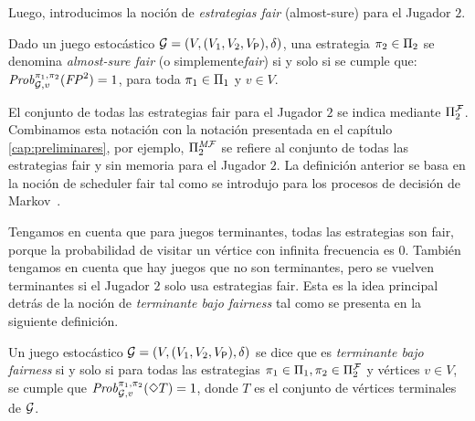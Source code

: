 
Luego, introducimos la noción de \emph{estrategias fair} (almost-sure) para el Jugador $2$.
\begin{definition} Dado un juego estocástico $\mathcal{G} = (V, (V_1, V_2, V_{\mathsf{P}}), \delta)$,
una estrategia $\pi_{2} \in \Pi_{2}$ se denomina \emph{almost-sure fair} (o simplemente\emph{fair}) si y solo si se cumple que:
$\mathit{Prob}^{\pi_{1}, \pi_{2}}_{\mathcal{G},v}(\mathit{FP}^2) = 1$,
para toda $\pi_{1} \in \Pi_{1}$ y $v \in V$. 
\end{definition}
%
El conjunto de todas las estrategias fair para el Jugador $2$ se indica mediante $\Pi^{\mathcal{F}}_{2}$. Combinamos esta notación con la notación presentada en el capítulo \ref{cap:preliminares}, por ejemplo, $\Pi^{\textit{M}\mathcal{F}}_{2}$ se refiere al conjunto de todas las estrategias fair y sin memoria para el Jugador $2$.
%
La definición anterior se basa en la noción de scheduler fair tal como se introdujo para los procesos de decisión de Markov~\cite{DBLP:journals/dc/BaierK98,BaierK08}.

Tengamos en cuenta que para juegos terminantes, todas las estrategias son fair, porque la probabilidad de visitar un vértice con infinita frecuencia es $0$.
%
También tengamos en cuenta que hay juegos que no son terminantes, pero se vuelven terminantes si el Jugador $2$ solo usa estrategias fair. Esta es la idea principal detrás de la noción de \emph{terminante bajo fairness} tal como se presenta en la siguiente definición.

	
\begin{definition}\label{def:stopping-under-fairness}
  Un juego estocástico $\mathcal{G} = (V, (V_1, V_2, V_{\mathsf{P}}), \delta)$ se dice que es \emph{terminante bajo fairness} si y solo si para todas las estrategias $\pi_{1} \in \Pi_{1}, \pi_{2} \in \Pi^{\mathcal{F}}_{2}$ y vértices $v \in V$, se cumple que
  $\mathit{Prob}^{\pi_{1}, \pi_{2}}_{\mathcal{G},v}(\Diamond T)=1$,  donde $T$ es el conjunto de vértices terminales de $\mathcal{G}$. 
\end{definition}


